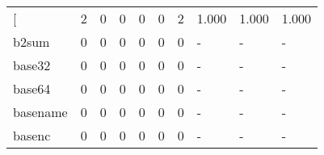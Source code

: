 \begin{longtable}{lp{1.3cm}p{1.3cm}p{1.3cm}p{1.3cm}p{1.3cm}p{1.3cm}p{1.3cm}p{1.3cm}p{1.3cm}}
\bottomrule
\endlastfoot
{[}         &                      2 &                                             0 &                                            0 &                                           0 &                                            0 &                                          2 &                                1.000 &                                  1.000 &                                1.000 \\
b2sum     &                      0 &                                             0 &                                            0 &                                           0 &                                            0 &                                          0 &                                    - &                                      - &                                    - \\
base32    &                      0 &                                             0 &                                            0 &                                           0 &                                            0 &                                          0 &                                    - &                                      - &                                    - \\
base64    &                      0 &                                             0 &                                            0 &                                           0 &                                            0 &                                          0 &                                    - &                                      - &                                    - \\
basename  &                      0 &                                             0 &                                            0 &                                           0 &                                            0 &                                          0 &                                    - &                                      - &                                    - \\
basenc    &                      0 &                                             0 &                                            0 &                                           0 &                                            0 &                                          0 &                                    - &                                      - &                                    - \\

\end{longtable}
